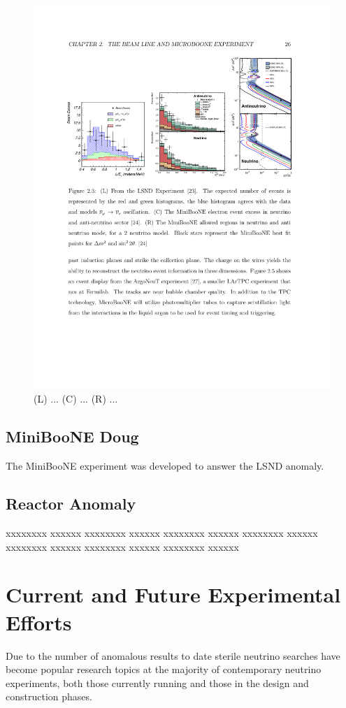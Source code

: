\documentclass[aps,prd,twocolumn,nofootinbib]{revtex4-1}
\begin{document}
\begin{figure}
  \includegraphics[width=1\textwidth]{../figures/lsnd_miniboone.pdf}
  \caption{(L) ... (C) ... (R) ...}
  \label{fig:lsnd_miniboone}
\end{figure}
\subsection{MiniBooNE Doug}
The MiniBooNE experiment was developed to answer the LSND anomaly.
\subsection{Reactor Anomaly}
xxxxxxxx xxxxxx xxxxxxxx xxxxxx xxxxxxxx xxxxxx xxxxxxxx xxxxxx xxxxxxxx xxxxxx xxxxxxxx xxxxxx xxxxxxxx xxxxxx
\section{Current and Future Experimental Efforts}
Due to the number of anomalous results to date sterile neutrino searches have become popular research topics at the majority of contemporary neutrino experiments, both those currently running and those in the design and construction phases.
\end{document}
